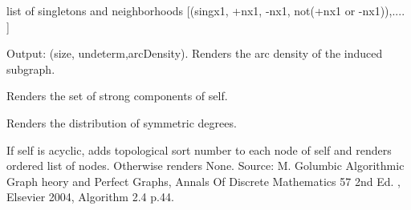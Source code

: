 \documentclass[letterpaper,10pt,english]{sphinxmanual}
\begin{document}
\begin{fulllineitems}

\begin{fulllineitems}
\label{techDoc:digraphs.Digraph.singletons}
list of singletons and neighborhoods
{[}(singx1, +nx1, -nx1, not(+nx1 or -nx1)),.... {]}

\end{fulllineitems}


\begin{fulllineitems}
\label{techDoc:digraphs.Digraph.sizeSubGraph}
Output: (size, undeterm,arcDensity).
Renders the arc density of the induced subgraph.

\end{fulllineitems}


\begin{fulllineitems}
\label{techDoc:digraphs.Digraph.strongComponents}
Renders the set of strong components of self.

\end{fulllineitems}


\begin{fulllineitems}
\label{techDoc:digraphs.Digraph.symDegreesDistribution}
Renders the distribution of symmetric degrees.

\end{fulllineitems}


\begin{fulllineitems}
\label{techDoc:digraphs.Digraph.topologicalSort}
If self is acyclic, adds topological sort number to each node of self
and renders ordered list of nodes. Otherwise renders None.
Source: M. Golumbic Algorithmic Graph heory and Perfect Graphs,
Annals Of Discrete Mathematics 57 2nd Ed. , Elsevier 2004, Algorithm 2.4 p.44.

\end{fulllineitems}


\end{fulllineitems}
\end{document}
